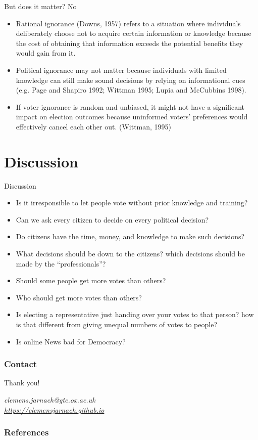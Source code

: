 \documentclass{beamer}
\begin{document}
\begin{frame}{But does it matter? No}
\begin{itemize}
    \item Rational ignorance (Downs, 1957) refers to a situation where individuals deliberately choose not to acquire certain information or knowledge because the cost of obtaining that information exceeds the potential benefits they would gain from it. 
    \item Political ignorance may not matter because individuals with limited knowledge can still make sound decisions by relying on informational cues (e.g. Page and Shapiro 1992; Wittman 1995; Lupia and McCubbins 1998).
    \item  If voter ignorance is random and unbiased, it might not have a significant impact on election outcomes because uninformed voters' preferences would effectively cancel each other out. (Wittman, 1995)
\end{itemize}
\end{frame}

\section{Discussion}
\begin{frame}{Discussion}
\begin{itemize}
    \item Is it irresponsible to let people vote without prior knowledge and training?
    \item Can we ask every citizen to decide on every political decision?
    \item Do citizens have the time,  money, and knowledge to make such decisions?
    \item What decisions should be down to the citizens? which decisions should be made by the “professionals”?
    \item Should some people get more votes than others?
    \item Who should get more votes than others?
    \item Is electing a representative just handing over your votes to that person? how is that different from giving unequal numbers of votes to people?
    \item Is online News bad for Democracy? 
\end{itemize}
\end{frame}



\begin{frame}
    \frametitle{Contact}
    \centering
    
    \Large\color{oxfordblue}
    Thank you!
    

    \vspace{0.5cm}
        \textit{clemens.jarnach@gtc.ox.ac.uk \\ 
        \href{https://clemensjarnach.github.io}{https://clemensjarnach.github.io}}

\end{frame}

\begin{frame}
\frametitle{References}
\tiny
\nocite{*}



\end{frame}

\end{document}
